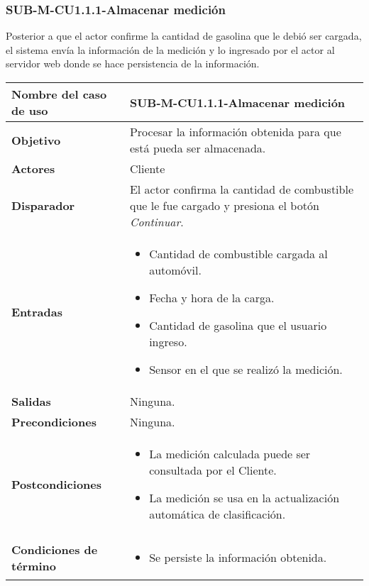\subsubsection{SUB-M-CU1.1.1-Almacenar medición}\label{SUB-M-CU1.1.1}
Posterior a que el actor confirme la cantidad de gasolina que le debió ser cargada, el sistema envía la información de la medición y lo ingresado por el actor al servidor web donde se hace persistencia de la información. 

\begin{longtable}{|J{5cm}|J{10.3cm}|}
	\hline
	\textbf{Nombre del caso de uso} &
		SUB-M-CU1.1.1-Almacenar medición \\ \hline
	\textbf{Objetivo} &
		Procesar la información obtenida para que está pueda ser almacenada. \\ \hline
	\textbf{Actores} &
		Cliente \\ \hline 
	\textbf{Disparador} & 
		El actor confirma la cantidad de combustible que le fue cargado y presiona el botón \textit{Continuar}. \\ \hline 
	\textbf{Entradas} & 
		\begin{itemize}
				\item Cantidad de combustible cargada al automóvil.
				\item Fecha y hora de la carga.
				\item Cantidad de gasolina que el usuario ingreso.
				\item Sensor en el que se realizó la medición.
		\end{itemize}\\ \hline 
	\textbf{Salidas} & Ninguna.
		\\ \hline
	\textbf{Precondiciones} & 
		Ninguna.\\ \hline
	\textbf{Postcondiciones} &
		\begin{itemize}
			\item La medición calculada puede ser consultada por el Cliente.
			\item La medición se usa en la actualización automática de clasificación.
		\end{itemize} \\ \hline
	\textbf{Condiciones de término} & 
		\begin{itemize}
			\item Se persiste la información obtenida.

\end{itemize}
\end{longtable}
